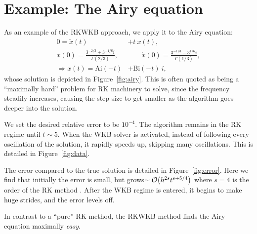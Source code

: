 \section{Example: The Airy equation}


As an example of the RKWKB approach, we apply it to the Airy equation:
\begin{align}
  0=\ddot{x}(t) &+ t\: x(t) ,
  \label{eqn:airy_equation}\\
  x(0)=\frac{3^{-2/3}+3^{-1/6}i}{\Gamma(2/3)},
  &\qquad
  \dot{x}(0) = \frac{3^{-1/3}-3^{1/6}i}{\Gamma(1/3)},
  \nonumber\\
  \Rightarrow x(t) = \mathrm{Ai}(-t) &+ \mathrm{Bi}(-t)\:i,
  \label{eqn:airy_solution}
\end{align}
whose solution is depicted in Figure~\ref{fig:airy}. This is often quoted as being a ``maximally hard'' problem for RK machinery to solve, since the frequency steadily increases, causing the step size to get smaller as the algorithm goes deeper into the solution.

We set the desired relative error to be \(10^{-4}\). The algorithm remains in the RK regime until \(t\sim5\). When the WKB solver is activated, instead of following every oscillation of the solution, it rapidly speeds up, skipping many oscillations. This is detailed in Figure~\ref{fig:data}.

The error compared to the true solution is detailed in Figure~\ref{fig:error}. Here we find that initially the error is small, but grows\({\sim\mathcal{O}{\left(h^{2s} t^{s+5/4}\right)}}\) where \(s=4\) is the order of the RK method \citep{Iserles02globalerror}. After the WKB regime is entered, it begins to make huge strides, and the error levels off.

In contrast to a ``pure'' RK method, the RKWKB method finds the Airy equation maximally {\em easy}.



